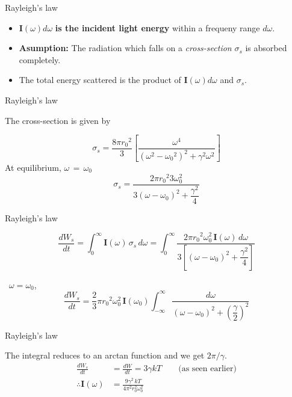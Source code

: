\documentclass[aspectratio=169]{beamer}
\begin{document}
\begin{frame}{Rayleigh's law}
	
	\begin{itemize}
		
		\item  $ \mathbf{I}(\omega)d\omega $ \textbf{is the incident light energy} within a frequeny range $d\omega$. \newline
		\item \textbf{Asumption:} The radiation which falls on a \textit{cross-section} $\sigma_s$ is absorbed completely. \newline
		\item The total energy scattered is the product of $ \mathbf{I}(\omega)d\omega $ and $ \sigma_s $.

	\end{itemize}
	
\end{frame}
			
\begin{frame}{Rayleigh's law} \vspace{0.5cm}

		The cross-section is given by

	
	{\large \[ \sigma_s = \frac{8\pi {r_0}^{2}}{3} \left[ \frac{\omega^{4}}{(\omega^2-{\omega_0}^{2})^2+\gamma^2 \omega^2}\right] \]}\newline
	At equilibrium, $ \omega\,=\,\omega_0 $ \newline 		
	{\large \[ \sigma_s = \frac{2\pi {r_0}^{2}{3} \omega_0^{2}}{3(\omega-\omega_0)^2+\dfrac{\gamma^2}{4}} \]}
	
\end{frame}
				
\begin{frame}{Rayleigh's law}

	\[ \frac{dW_s}{dt}=\int_0^{\infty}{\mathbf{I}(\omega)\,\sigma_s \, d\omega} = \int_0^{\infty}{\frac{2\pi {r_0}^{2} \omega_0^{2} \, \mathbf{I}(\omega)\, d\omega}{3 \left[ (\omega-\omega_0)^2+\dfrac{\gamma^2}{4} \right] }} \] \newline

	 \because \, $\omega =\omega_0 $, 
	\[ \frac{dW_s}{dt}= \frac{2}{3}\pi {r_0}^{2} \omega_0^{2} \, \mathbf{I}(\omega_0) \int_{-\infty}^{\infty}{\frac{d\omega}{(\omega-\omega_0)^2+{\left(  \dfrac{\gamma}{2} \right)}^{2}}}  \]

\end{frame}

\begin{frame}{Rayleigh's law}\vspace{1cm}

	The integral reduces to an arctan function and we get $2\pi / \gamma$. \vspace{.5cm}
		\begin{align*}
			\frac{dW_s}{dt} &= \frac{dW}{dt} = 3 \gamma kT \qquad \textrm{(as seen earlier)} \\[2ex]
			\therefore \mathbf{I}(\omega) &= \frac{9\gamma^2\,kT}{4\pi^2 r_0^2\omega_0^2} \\
		\end{align*}
	
\end{frame}
\end{document}

